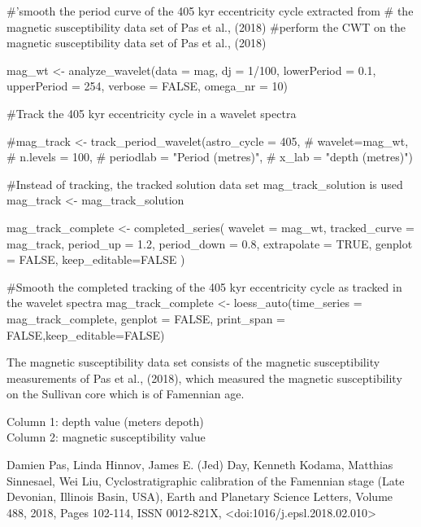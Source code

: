 \documentclass[a4paper]{book}
\begin{document}
%
\begin{Examples}
\begin{ExampleCode}

#'smooth the period curve of the 405 kyr eccentricity cycle extracted from
# the magnetic susceptibility data set of Pas et al., (2018)
#perform the CWT on the magnetic susceptibility data set of Pas et al., (2018)

mag_wt <- analyze_wavelet(data = mag,
dj = 1/100,
lowerPeriod = 0.1,
upperPeriod = 254,
verbose = FALSE,
omega_nr = 10)

#Track the 405 kyr eccentricity cycle in a wavelet spectra

#mag_track <- track_period_wavelet(astro_cycle = 405,
#                                   wavelet=mag_wt,
#                                   n.levels = 100,
#                                   periodlab = "Period (metres)",
#                                   x_lab = "depth (metres)")

#Instead of tracking, the tracked solution data set mag_track_solution is used
mag_track <- mag_track_solution

mag_track_complete <- completed_series(
  wavelet = mag_wt,
  tracked_curve = mag_track,
  period_up = 1.2,
  period_down = 0.8,
  extrapolate = TRUE,
  genplot = FALSE,
  keep_editable=FALSE
)

#Smooth the completed tracking of the 405 kyr eccentricity cycle as tracked in the wavelet spectra
mag_track_complete <- loess_auto(time_series = mag_track_complete,
genplot = FALSE, print_span = FALSE,keep_editable=FALSE)

\end{ExampleCode}
\end{Examples}
%
\begin{Description}
The magnetic susceptibility data set consists
of the magnetic susceptibility measurements of Pas et al., (2018), which measured the magnetic
susceptibility on the Sullivan core which is of Famennian age.
\end{Description}
%
\begin{Details}
Column 1: depth value (meters depoth)\\{}
Column 2: magnetic susceptibility  value\\{}
\end{Details}
%
\begin{References}
Damien Pas, Linda Hinnov, James E. (Jed) Day, Kenneth Kodama, Matthias Sinnesael, Wei Liu,
Cyclostratigraphic calibration of the Famennian stage (Late Devonian, Illinois Basin, USA),
Earth and Planetary Science Letters,
Volume 488,
2018,
Pages 102-114,
ISSN 0012-821X,
<doi:1016/j.epsl.2018.02.010>
\end{References}
\end{document}
